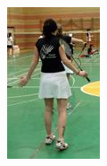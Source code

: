 \begin{figure}[h]
\begin{subfigure}[b]{.15\textwidth}
  \includegraphics[height=4\textwidth / 3]{./images/LSP4}

\end{subfigure}
\end{figure}

